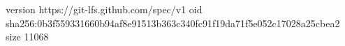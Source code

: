 version https://git-lfs.github.com/spec/v1
oid sha256:0b3f559331660b94af8e91513b363c340fc91f19da71f5e052c17028a25cbea2
size 11068
